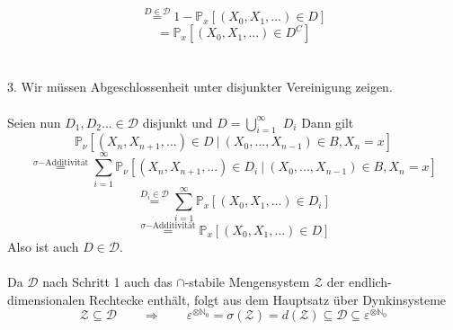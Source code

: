 \begin{equation*}
\stackrel{D \in \mathcal{D}}{=} 1 - \mathbb{P}_{x}[(X_{0},X_{1},...) \in D]
\end{equation*}
\begin{equation*}
= \mathbb{P}_{x}[(X_{0},X_{1},...) \in D^{C}]
\end{equation*}
\\
\\
3. Wir müssen Abgeschlossenheit unter disjunkter Vereinigung zeigen.
\\
\\
Seien nun $D_{1},D_{2}... \in \mathcal{D}$ disjunkt und $D = \bigcup_{i=1}^{\infty} $ $D_{i}$ Dann gilt
\begin{equation*}
\mathbb{P}_{\nu}[(X_{n},X_{n+1},...) \in D \: | \: (X_{0},...,X_{n-1})  \in B, X_{n} = x]
\end{equation*}
\begin{equation*}
\stackrel{\sigma \mathrm{-Additivität}}{=}  \sum_{i=1}^{\infty} \mathbb{P}_{\nu}[(X_{n},X_{n+1},...) \in D_{i} \: | \: (X_{0},...,X_{n-1})  \in B, X_{n} = x]
\end{equation*}
\begin{equation*}
\stackrel{D_{i} \in \mathcal{D}}{=} \sum_{i=1}^{\infty} \mathbb{P}_{x}[(X_{0},X_{1},...) \in D_{i}]
\end{equation*}
\begin{equation*}
\stackrel{\sigma \mathrm{-Additivität}}{=} \mathbb{P}_{x}[(X_{0},X_{1},...) \in D]
\end{equation*}
Also ist auch $D \in \mathcal{D}$.
\\
\\ 
Da $\mathcal{D}$ nach Schritt 1 auch das $\cap$-stabile Mengensystem $\mathcal{Z}$ der endlich-dimensionalen Rechtecke enthält, folgt aus dem Hauptsatz über Dynkinsysteme  
\begin{equation*}
\mathcal{Z} \subseteq \mathcal{D} \qquad \Rightarrow \qquad \varepsilon^{ \otimes \mathbb{N}_{0}} = \sigma(\mathcal{Z}) = d(\mathcal{Z}) \subseteq \mathcal{D} \subseteq \varepsilon^{ \otimes \mathbb{N}_{0}}
\end{equation*}
